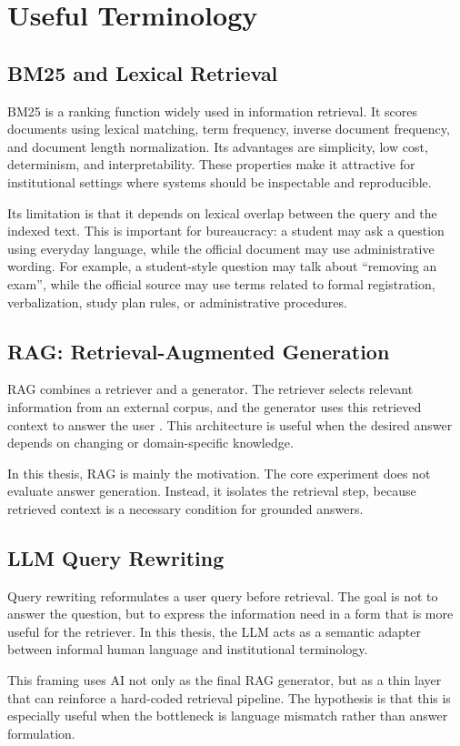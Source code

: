\chapter{Useful Terminology}

\section{BM25 and Lexical Retrieval}
BM25 is a ranking function widely used in information retrieval. It scores documents using lexical matching, term frequency, inverse document frequency, and document length normalization. Its advantages are simplicity, low cost, determinism, and interpretability. These properties make it attractive for institutional settings where systems should be inspectable and reproducible.

Its limitation is that it depends on lexical overlap between the query and the indexed text. This is important for bureaucracy: a student may ask a question using everyday language, while the official document may use administrative wording. For example, a student-style question may talk about ``removing an exam'', while the official source may use terms related to formal registration, verbalization, study plan rules, or administrative procedures.

\section{RAG: Retrieval-Augmented Generation}
RAG combines a retriever and a generator. The retriever selects relevant information from an external corpus, and the generator uses this retrieved context to answer the user \cite{lewis2020retrieval}. This architecture is useful when the desired answer depends on changing or domain-specific knowledge.

In this thesis, RAG is mainly the motivation. The core experiment does not evaluate answer generation. Instead, it isolates the retrieval step, because retrieved context is a necessary condition for grounded answers.

\section{LLM Query Rewriting}
Query rewriting reformulates a user query before retrieval. The goal is not to answer the question, but to express the information need in a form that is more useful for the retriever. In this thesis, the LLM acts as a semantic adapter between informal human language and institutional terminology.

This framing uses AI not only as the final RAG generator, but as a thin layer that can reinforce a hard-coded retrieval pipeline. The hypothesis is that this is especially useful when the bottleneck is language mismatch rather than answer formulation.
\par
